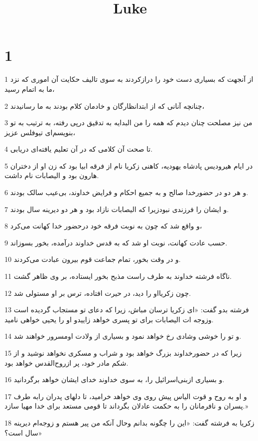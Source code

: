 

\title{Luke}


\chapter{1}

\par 1 از آنجهت که بسیاری دست خود را درازکردند به سوی تالیف حکایت آن اموری که نزد ما به اتمام رسید،
\par 2 چنانچه آنانی که از ابتدانظارگان و خادمان کلام بودند به ما رسانیدند،
\par 3 من نیز مصلحت چنان دیدم که همه را من البدایه به تدقیق در‌پی رفته، به ترتیب به تو بنویسم‌ای تیوفلس عزیز،
\par 4 تا صحت آن کلامی که در آن تعلیم یافته‌ای دریابی.
\par 5 در ایام هیرودیس پادشاه یهودیه، کاهنی زکریا نام از فرقه ابیا بود که زن او از دختران هارون بود و الیصابات نام داشت.
\par 6 و هر دو در حضورخدا صالح و به جمیع احکام و فرایض خداوند، بی‌عیب سالک بودند.
\par 7 و ایشان را فرزندی نبودزیرا که الیصابات نازاد بود و هر دو دیرینه سال بودند.
\par 8 و واقع شد که چون به نوبت فرقه خود درحضور خدا کهانت می‌کرد،
\par 9 حسب عادت کهانت، نوبت او شد که به قدس خداوند درآمده، بخور بسوزاند.
\par 10 و در وقت بخور، تمام جماعت قوم بیرون عبادت می‌کردند.
\par 11 ناگاه فرشته خداوند به طرف راست مذبح بخور ایستاده، بر وی ظاهر گشت.
\par 12 چون زکریااو را دید، در حیرت افتاده، ترس بر او مستولی شد.
\par 13 فرشته بدو گفت: «ای زکریا ترسان مباش، زیرا که دعای تو مستجاب گردیده است وزوجه ات الیصابات برای تو پسری خواهد زاییدو او را یحیی خواهی نامید.
\par 14 و تو را خوشی وشادی رخ خواهد نمود و بسیاری از ولادت اومسرور خواهند شد.
\par 15 زیرا که در حضورخداوند بزرگ خواهد بود و شراب و مسکری نخواهد نوشید و از شکم مادر خود، پر ازروح‌القدس خواهد بود.
\par 16 و بسیاری ازبنی‌اسرائیل را، به سوی خداوند خدای ایشان خواهد برگردانید.
\par 17 و او به روح و قوت الیاس پیش روی وی خواهد خرامید، تا دلهای پدران رابه طرف پسران و نافرمانان را به حکمت عادلان بگرداند تا قومی مستعد برای خدا مهیا سازد.»
\par 18 زکریا به فرشته گفت: «این را چگونه بدانم وحال آنکه من پیر هستم و زوجه‌ام دیرینه سال است؟»
